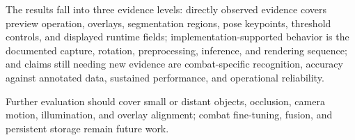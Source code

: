 The results fall into three evidence levels: directly observed evidence covers preview operation,
overlays, segmentation regions, pose keypoints, threshold controls, and displayed runtime fields;
implementation-supported behavior is the documented capture, rotation, preprocessing, inference, and
rendering sequence; and claims still needing new evidence are combat-specific recognition, accuracy
against annotated data, sustained performance, and operational reliability.

Further evaluation should cover small or distant objects, occlusion, camera motion, illumination, and
overlay alignment; combat fine-tuning, fusion, and persistent storage remain future work.
\label{end:discussion}\label{end:result}
